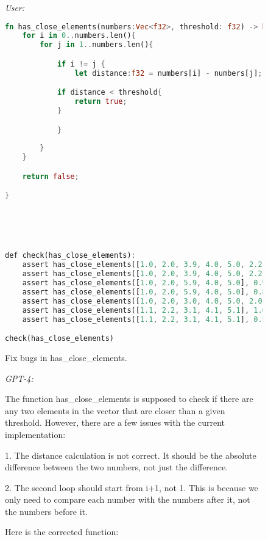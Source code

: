 \begin{figure}[htbp]
\hrulefill

\emph{User:}

\hrulefill

\begin{lstlisting}[language=Rust,breaklines=true,basicstyle=\ttfamily\scriptsize]
fn has_close_elements(numbers:Vec<f32>, threshold: f32) -> bool{
    for i in 0..numbers.len(){
        for j in 1..numbers.len(){

            if i != j {
                let distance:f32 = numbers[i] - numbers[j];

            if distance < threshold{
                return true;
            }

            }
            
        }
    }

    return false;

}





def check(has_close_elements):
    assert has_close_elements([1.0, 2.0, 3.9, 4.0, 5.0, 2.2], 0.3) == True
    assert has_close_elements([1.0, 2.0, 3.9, 4.0, 5.0, 2.2], 0.05) == False
    assert has_close_elements([1.0, 2.0, 5.9, 4.0, 5.0], 0.95) == True
    assert has_close_elements([1.0, 2.0, 5.9, 4.0, 5.0], 0.8) == False
    assert has_close_elements([1.0, 2.0, 3.0, 4.0, 5.0, 2.0], 0.1) == True
    assert has_close_elements([1.1, 2.2, 3.1, 4.1, 5.1], 1.0) == True
    assert has_close_elements([1.1, 2.2, 3.1, 4.1, 5.1], 0.5) == False

check(has_close_elements)
\end{lstlisting}
Fix bugs in has\_close\_elements.

\hrulefill

\emph{GPT-4:}

\hrulefill

The function has\_close\_elements is supposed to check if there are any two elements in the vector that are closer than a given threshold. However, there are a few issues with the current implementation:


1. The distance calculation is not correct. It should be the absolute difference between the two numbers, not just the difference.


2. The second loop should start from i+1, not 1. This is because we only need to compare each number with the numbers after it, not the numbers before it.


Here is the corrected function:



\end{figure}
